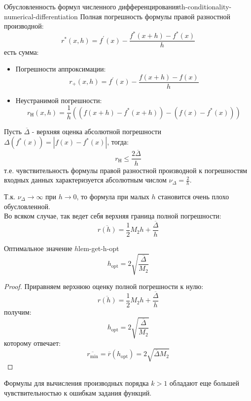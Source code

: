 \documentclass[14pt]{extarticle}
\begin{document}
    \begin{example}{Обусловленность формул численного дифференцирования}{th-conditionality-numerical-differentiation}
        Полная погрешность формулы правой разностной производной:
        $$r^{*}(x, h) = f^{'}(x) - \frac{f^{*}(x + h) - f^{*}(x)}{h}$$
        есть сумма: 
        \begin{itemize}
            \item Погрешности аппроксимации: $$r_{+}(x, h) = f^{'}(x) - \frac{f(x + h) - f(x)}{h}$$
            \item Неустранимой погрешности: $$r_{\text{Н}}(x, h) = \frac{1}{h}((f(x+h) - f^{*}(x + h)) - (f(x) - f^{*}(x)))$$
        \end{itemize}

        Пусть $\overline{\Delta}$ - верхняя оценка абсолютной погрешности $\Delta(f^{*}(x)) = |f(x) - f^{*}(x)|$, тогда:
        $$r_{\text{Н}} \leq \frac{2\overline{\Delta}}{h}$$
        т.е. чувствительность формулы правой разностной производной к погрешностям входных данных характеризуется абсолютным числом $\nu_{\Delta} = \frac{2}{h}$.

        \vspace{\baselineskip}

        Т.к. $\nu_{\Delta} \to \infty$ при $h \to 0$, то формула при малых $h$ становится очень плохо обусловленной.\\
        Во всяком случае, так ведет себя верхняя граница полной погрешности:
        $$\overline{r(h)} = \frac{1}{2}M_{2}h + \frac{\overline{\Delta}}{h}$$
    \end{example}

    \begin{lemma}{Оптимальное значение $h$}{lem-get-h-opt}
        $$h_{\text{opt}} = 2\sqrt{\frac{\overline{\Delta}}{M_{2}}}$$

        \begin{proof}
            Приравняем верхнюю оценку полной погрешности к нулю:
            $$\overline{r(h)} = \frac{1}{2}M_{2}h + \frac{\overline{\Delta}}{h}$$
            получим:
            $$h_{\text{opt}} = 2\sqrt{\frac{\overline{\Delta}}{M_{2}}}$$
            которому отвечает:
            $$\overline{r_{\min}} = \overline{r}(h_{\text{opt}}) = 2\sqrt{\overline{\Delta}M_{2}}$$
        \end{proof}
    \end{lemma}

    Формулы для вычисления производных порядка $k  > 1$ обладают еще большей чувствительностью к ошибкам задания функций.
\end{document}
